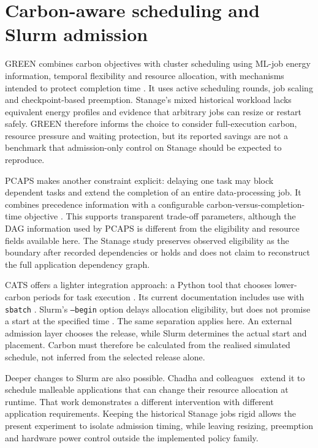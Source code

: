 \section{Carbon-aware scheduling and Slurm admission}

GREEN combines carbon objectives with cluster scheduling using ML-job energy information, temporal flexibility and resource allocation, with mechanisms intended to protect completion time \citep{xu2025green}. It uses active scheduling rounds, job scaling and checkpoint-based preemption. Stanage's mixed historical workload lacks equivalent energy profiles and evidence that arbitrary jobs can resize or restart safely. GREEN therefore informs the choice to consider full-execution carbon, resource pressure and waiting protection, but its reported savings are not a benchmark that admission-only control on Stanage should be expected to reproduce.

PCAPS makes another constraint explicit: delaying one task may block dependent tasks and extend the completion of an entire data-processing job. It combines precedence information with a configurable carbon-versus-completion-time objective \citep{lechowicz2025pcaps}. This supports transparent trade-off parameters, although the DAG information used by PCAPS is different from the eligibility and resource fields available here. The Stanage study preserves observed eligibility as the boundary after recorded dependencies or holds and does not claim to reconstruct the full application dependency graph.

CATS offers a lighter integration approach: a Python tool that chooses lower-carbon periods for task execution \citep{cats2025}. Its current documentation includes use with \texttt{sbatch} \citep{catsSchedulers}. Slurm's \texttt{--begin} option delays allocation eligibility, but does not promise a start at the specified time \citep{schedmdSbatch}. The same separation applies here. An external admission layer chooses the release, while Slurm determines the actual start and placement. Carbon must therefore be calculated from the realised simulated schedule, not inferred from the selected release alone.

Deeper changes to Slurm are also possible. Chadha and colleagues~\citep{chadha2020slurm} extend it to schedule malleable applications that can change their resource allocation at runtime. That work demonstrates a different intervention with different application requirements. Keeping the historical Stanage jobs rigid allows the present experiment to isolate admission timing, while leaving resizing, preemption and hardware power control outside the implemented policy family.

